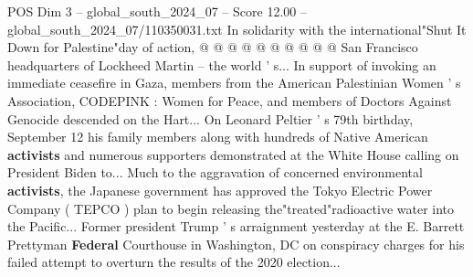 \begin{textsample}{POS Dim 3 – global\_south\_2024\_07 – Score 12.00 – global\_south\_2024\_07/110350031.txt}
In solidarity with the international"Shut It Down for Palestine"day of action, @ @ @ @ @ @ @ @ @ @ San Francisco headquarters of Lockheed Martin -- the world ' s...
In support of invoking an immediate ceasefire in Gaza, members from the American Palestinian Women ' s Association, CODEPINK : Women for Peace, and members of Doctors Against Genocide descended on the Hart...
On Leonard Peltier ' s 79th birthday, September 12 his family members along with hundreds of Native American \textbf{activists} and numerous supporters demonstrated at the White House calling on President Biden to...
Much to the aggravation of concerned environmental \textbf{activists}, the Japanese government has approved the Tokyo Electric Power Company ( TEPCO ) plan to begin releasing the"treated"radioactive water into the Pacific...
Former president Trump ' s arraignment yesterday at the E.
Barrett Prettyman \textbf{Federal} Courthouse in Washington, DC on conspiracy charges for his failed attempt to overturn the results of the 2020 election...

\end{textsample}
